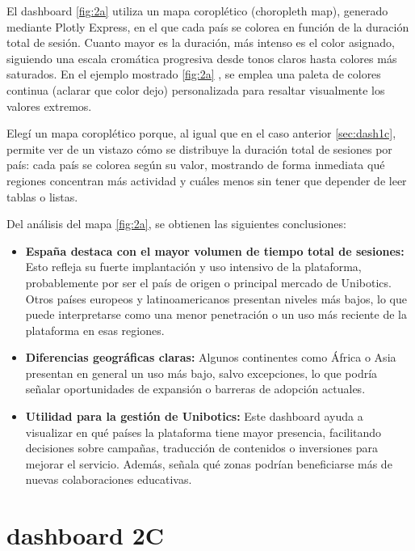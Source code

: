 \documentclass[a4paper, 12pt]{book}
\begin{document}
El dashboard \ref{fig:2a} utiliza un mapa coroplético (choropleth map), generado mediante Plotly Express, en el que cada país se colorea en función de la duración total de sesión. Cuanto mayor es la duración, más intenso es el color asignado, siguiendo una escala cromática progresiva desde tonos claros hasta colores más saturados. En el ejemplo mostrado \ref{fig:2a} , se emplea una paleta de colores continua (aclarar que color dejo) personalizada para resaltar visualmente los valores extremos.

Elegí un mapa coroplético porque, al igual que en el caso anterior \ref{sec:dash1c}, permite ver de un vistazo cómo se distribuye la duración total de sesiones por país: cada país se colorea según su valor, mostrando de forma inmediata qué regiones concentran más actividad y cuáles menos sin tener que depender de leer tablas o listas.

Del análisis del mapa \ref{fig:2a}, se obtienen las siguientes conclusiones:

\begin{itemize}
  \item \textbf{España destaca con el mayor volumen de tiempo total de sesiones:} Esto refleja su fuerte implantación y uso intensivo de la plataforma, probablemente por ser el país de origen o principal mercado de Unibotics. Otros países europeos y latinoamericanos presentan niveles más bajos, lo que puede interpretarse como una menor penetración o un uso más reciente de la plataforma en esas regiones.

  \item \textbf{Diferencias geográficas claras:} Algunos continentes como África o Asia presentan en general un uso más bajo, salvo excepciones, lo que podría señalar oportunidades de expansión o barreras de adopción actuales.

  \item \textbf{Utilidad para la gestión de Unibotics:} Este dashboard ayuda a visualizar en qué países la plataforma tiene mayor presencia, facilitando decisiones sobre campañas, traducción de contenidos o inversiones para mejorar el servicio. Además, señala qué zonas podrían beneficiarse más de nuevas colaboraciones educativas.
  
\end{itemize}


\section{dashboard 2C}
\end{document}
